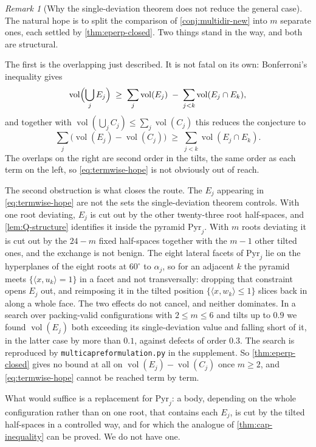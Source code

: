 \documentclass[11pt,reqno]{amsart}
\renewcommand{\_}{\origunderscore\allowbreak}
\numberwithin{equation}{section}
\theoremstyle{plain}
\theoremstyle{definition}
\theoremstyle{remark}
\newtheorem{remark}[thm]{Remark}
\newcommand{\base}{u}                        %
\DeclareMathOperator{\vol}{vol}
\begin{document}
\begin{remark}[Why the single-deviation theorem does not reduce the general case]\label{rem:first-order-obstruction}
The natural hope is to split the comparison of \cref{conj:multidir-new}
into $m$ separate ones, each settled by \cref{thm:eperp-closed}. Two
things stand in the way, and both are structural.

The first is the overlapping just described. It is not fatal on its own:
Bonferroni's inequality gives
\[
  \vol\Bigl(\bigcup_{j}E_j\Bigr)\;\ge\;\sum_j\vol(E_j)
  \;-\;\sum_{j<k}\vol(E_j\cap E_k),
\]
and together with $\vol(\bigcup_jC_j)\le\sum_j\vol(C_j)$ this reduces
the conjecture to
\begin{equation}\label{eq:termwise-hope}
  \sum_j\bigl(\vol(E_j)-\vol(C_j)\bigr)\;\ge\;\sum_{j<k}\vol(E_j\cap E_k).
\end{equation}
The overlaps on the right are second order in the tilts, the same order
as each term on the left, so \eqref{eq:termwise-hope} is not obviously
out of reach.

The second obstruction is what closes the route. The $E_j$ appearing in
\eqref{eq:termwise-hope} are not the sets the single-deviation theorem
controls. With one root deviating, $E_j$ is cut out by the other
twenty-three root half-spaces, and \cref{lem:Q-structure} identifies
it inside the pyramid $\mathrm{Pyr}_j$. With $m$ roots deviating it is
cut out by the $24-m$ fixed half-spaces together with the $m-1$ other
tilted ones, and the exchange is not benign. The eight lateral facets of
$\mathrm{Pyr}_j$ lie on the hyperplanes of the eight roots at $60^\circ$
to $\alpha_j$, so for an adjacent $k$ the pyramid meets $\{\langle
x,\base_k\rangle=1\}$ in a facet and not transversally: dropping
that constraint opens $E_j$ out, and reimposing it in the tilted
position $\{\langle x,w_k\rangle\le1\}$ slices back in along a whole
face. The two effects do not cancel, and neither dominates. In a search
over packing-valid configurations with $2\le m\le6$ and tilts up to
$0.9$ we found $\vol(E_j)$ both exceeding its single-deviation value and
falling short of it, in the latter case by more than $0.1$, against
defects of order $0.3$. The search is reproduced by
\texttt{multi\_cap\_reformulation.py} in the supplement. So \cref{thm:eperp-closed} gives no bound at all
on $\vol(E_j)-\vol(C_j)$ once $m\ge2$, and \eqref{eq:termwise-hope}
cannot be reached term by term.

What would suffice is a replacement for $\mathrm{Pyr}_j$: a body,
depending on the whole configuration rather than on one root, that
contains each $E_j$, is cut by the tilted half-spaces in a controlled
way, and for which the analogue of \cref{thm:cap-inequality} can be
proved. We do not have one.
\end{remark}
\end{document}

